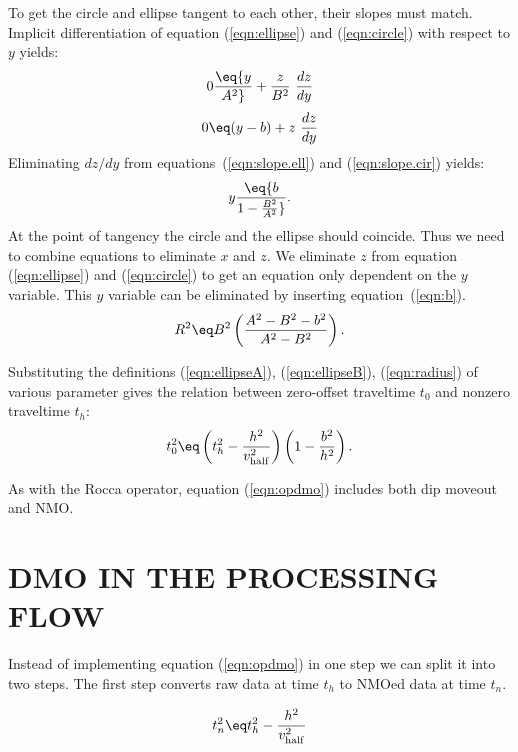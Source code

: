 To get the circle and ellipse tangent to each other,
their slopes must match.
Implicit differentiation of equation (\ref{eqn:ellipse}) and (\ref{eqn:circle})
with respect to $y$ yields:
\begin{equation}
        \label{eqn:slope.ell}
	0 \eq {y \over{A^2}} + {z \over{B^2}}
	\ {dz \over dy}
\end{equation}
\begin{equation}
        \label{eqn:slope.cir}
	0 \eq (y-b) + z
	\ {dz \over dy}
\end{equation}
\noindent
Eliminating $dz/dy$ from equations~(\ref{eqn:slope.ell}) and (\ref{eqn:slope.cir}) yields:
\begin{equation}
        \label{eqn:b}
	y \eq {b\over 1 - {B^{2}\over{A^{2}}}}   .
\end{equation}
At the point of tangency the circle and the ellipse should coincide.
Thus we need to combine equations to eliminate $x$ and $z$.
We eliminate $z$ from equation (\ref{eqn:ellipse}) and (\ref{eqn:circle})
to get an equation only dependent on the $y$ variable. 
This $y$ variable can be eliminated by inserting equation~(\ref{eqn:b}).
\begin{equation}
        \label{eqn:geodmo}
	R^2 \eq B^2 \left( {A^2 - B^2 - b^2 \over{A^2 - B^2}} \right).
\end{equation}
\par
Substituting the definitions (\ref{eqn:ellipseA}), (\ref{eqn:ellipseB}), 
(\ref{eqn:radius}) of various parameter gives the
relation between zero-offset traveltime $t_0$ and nonzero traveltime
$t_h$:
\begin{equation}
        \label{eqn:opdmo}
	t_0^2\eq
	\left(t_h^2-{h^{2}\over\vhalf^2}\right)
	\left(1-{b^2\over h^2}\right).
\end{equation}

As with the Rocca operator, equation (\ref{eqn:opdmo})
includes both dip moveout  and NMO.

\section{DMO IN THE PROCESSING FLOW}
\par
Instead of implementing equation (\ref{eqn:opdmo})
in one step we can split it into two steps. 
The first step converts raw data at time $t_h$
to NMOed data at time $t_n$.

\begin{equation}
	\label{eqn:nmoeq}
	t_n^2 \eq t_h^2 - {h^2 \over{\vhalf^2}}
\end{equation}

